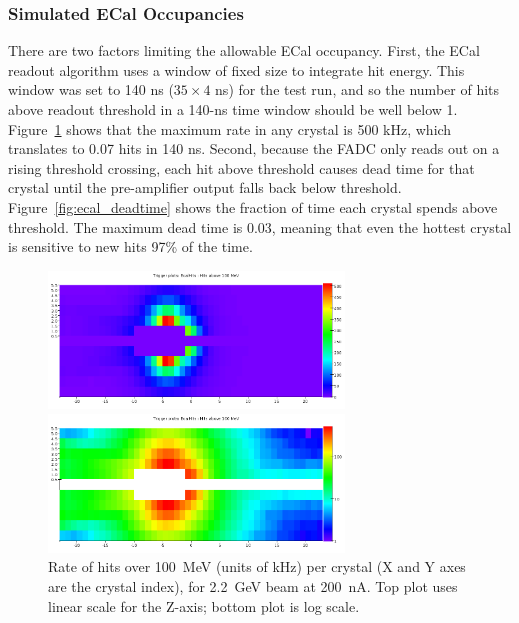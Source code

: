\clearpage

\subsubsection{Simulated ECal Occupancies}

There are two factors limiting the allowable ECal occupancy. First, the ECal 
readout algorithm uses a window of fixed size to integrate hit energy. This 
window was set to 140 ns ($35 \times 4$ ns) for the test run, and so the 
number of hits above readout threshold in a 140-ns time window should be well 
below 1. Figure~\ref{fig:ecal_rate} shows that the maximum rate in any crystal 
is 500 kHz, which translates to 0.07 hits in 140 ns. 
Second, because the FADC only reads out on a rising threshold crossing, each 
hit above threshold causes dead time for that crystal until the pre-amplifier output 
falls back below threshold. Figure~\ref{fig:ecal_deadtime} shows the fraction 
of time each crystal spends above threshold. The maximum dead time is 0.03, 
meaning that even the hottest crystal is sensitive to new hits 97\% of the time.

\begin{figure}[ht]
	\includegraphics[width=0.7\textwidth]{performance/ecal_rate_100mev_22}

	\includegraphics[width=0.7\textwidth]{performance/ecal_rate_100mev_22_log}
	\caption{\small{Rate of hits over 100~MeV (units of kHz) per crystal (X and Y axes are the crystal index), 
for 2.2~GeV beam at 200~nA. Top plot uses linear scale for the Z-axis; bottom plot is log scale.}}
	\label{fig:ecal_rate}
\end{figure}

